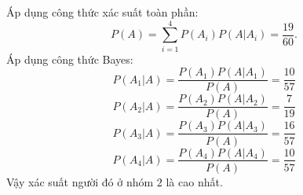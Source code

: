\documentclass[12pt,a4paper]{article}
\begin{document}
Áp dụng công thức xác suất toàn phần:
$$P\left( A \right) = \sum\limits_{i = 1}^4 {P\left( {{A_i}} \right)} P\left( {\left. A \right|{A_i}} \right) = \frac{{19}}{{60}}.$$
Áp dụng công thức Bayes:
$$P\left( {\left. {{A_1}} \right|A} \right) = \frac{{P\left( {{A_1}} \right)P\left( {\left. A \right|{A_1}} \right)}}{{P\left( A \right)}} = \frac{{10}}{{57}}$$
$$P\left( {\left. {{A_2}} \right|A} \right) = \frac{{P\left( {{A_2}} \right)P\left( {\left. A \right|{A_2}} \right)}}{{P\left( A \right)}} = \frac{7}{{19}}$$
$$P\left( {\left. {{A_3}} \right|A} \right) = \frac{{P\left( {{A_3}} \right)P\left( {\left. A \right|{A_3}} \right)}}{{P\left( A \right)}} = \frac{{16}}{{57}}$$
$$P\left( {\left. {{A_4}} \right|A} \right) = \frac{{P\left( {{A_4}} \right)P\left( {\left. A \right|{A_4}} \right)}}{{P\left( A \right)}} = \frac{{10}}{{57}}$$
Vậy xác suất người đó ở nhóm $2$ là cao nhất.
\end{document}
